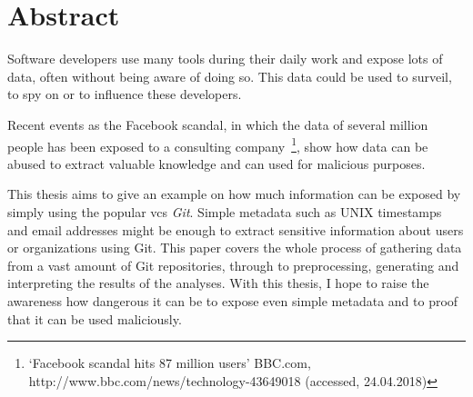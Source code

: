 \chapter*{Abstract}

Software developers use many tools during their daily work and expose lots of data, often without being aware of doing so.
This data could be used to surveil, to spy on or to influence these developers.

Recent events as the Facebook scandal, in which the data of several million people has been exposed to a consulting company~\footnote{`Facebook scandal hits 87 million users' BBC.com, http://www.bbc.com/news/technology-43649018 (accessed, 24.04.2018)}, show how data can be abused to extract valuable knowledge and can used for malicious purposes.

This thesis aims to give an example on how much information can be exposed by simply using the popular \ac{vcs} \emph{Git}.
Simple metadata such as UNIX timestamps and email addresses might be enough to extract sensitive information about users or organizations using Git.
This paper covers the whole process of gathering data from a vast amount of Git repositories, through to preprocessing, generating and interpreting the results of the analyses.
With this thesis, I hope to raise the awareness how dangerous it can be to expose even simple metadata and to proof that it can be used maliciously.
